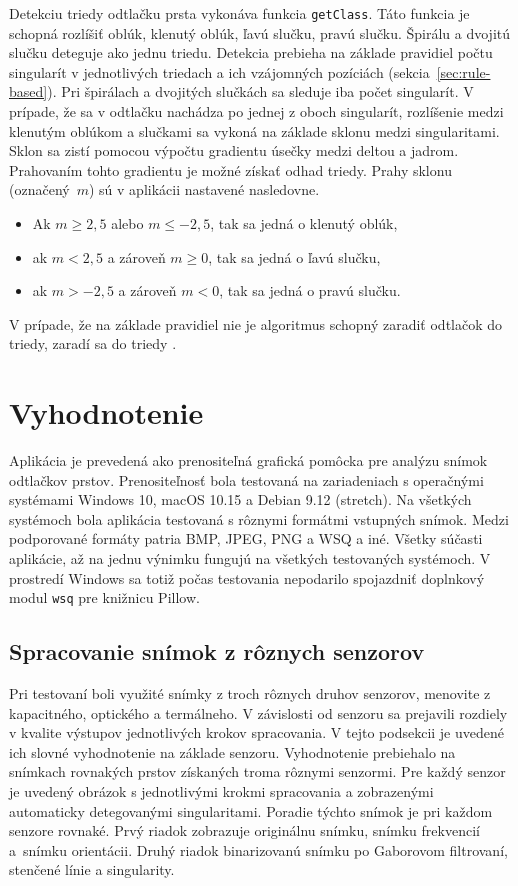   Detekciu triedy odtlačku prsta vykonáva funkcia \texttt{getClass}. Táto funkcia je schopná rozlíšiť oblúk, klenutý oblúk, ľavú slučku, pravú slučku.
  Špirálu a dvojitú slučku deteguje ako jednu triedu. Detekcia prebieha na základe pravidiel počtu singularít v jednotlivých triedach a ich vzájomných
  pozíciách (sekcia~{\ref{sec:rule-based}}). Pri špirálach a dvojitých slučkách sa sleduje iba počet singularít. V prípade, že sa
  v odtlačku nachádza po jednej z oboch singularít, rozlíšenie medzi klenutým oblúkom a slučkami sa vykoná na základe sklonu medzi singularitami. Sklon sa
  zistí pomocou výpočtu gradientu úsečky medzi deltou a jadrom. Prahovaním tohto gradientu je možné získať odhad triedy. Prahy sklonu (označený~{$m$})
  sú v aplikácii nastavené nasledovne.
  \begin{itemize}
    \item Ak $m \geq 2,5$ alebo $m \leq -2,5$, tak sa jedná o klenutý oblúk,
    \item ak $m < 2,5$ a zároveň $m \geq 0$, tak sa jedná o ľavú slučku,
    \item ak $m > -2,5$ a zároveň $m < 0$, tak sa jedná o pravú slučku.
  \end{itemize}
  V prípade, že na základe pravidiel nie je algoritmus schopný zaradiť odtlačok do triedy, zaradí sa do triedy .

\chapter{Vyhodnotenie} \label{kap:vyhodnotenie}
  Aplikácia je prevedená ako prenositeľná grafická pomôcka pre analýzu snímok odtlačkov prstov. Prenositeľnosť bola testovaná na zariadeniach s operačnými
  systémami Windows 10, macOS 10.15 a Debian 9.12 (stretch). Na všetkých systémoch bola aplikácia testovaná s rôznymi formátmi vstupných snímok. Medzi
  podporované formáty patria BMP, JPEG, PNG a WSQ a iné. Všetky súčasti aplikácie, až na jednu výnimku fungujú na všetkých testovaných systémoch. V prostredí
  Windows sa totiž počas testovania nepodarilo spojazdniť doplnkový modul \texttt{wsq} pre knižnicu Pillow.

  \section{Spracovanie snímok z rôznych senzorov}
  Pri testovaní boli využité snímky z troch rôznych druhov senzorov, menovite z kapacitného, optického a termálneho. V závislosti od senzoru sa prejavili
  rozdiely v kvalite výstupov jednotlivých krokov spracovania. V tejto podsekcii je uvedené ich slovné vyhodnotenie na základe senzoru.
  Vyhodnotenie prebiehalo na snímkach rovnakých prstov získaných troma rôznymi senzormi. Pre každý senzor je uvedený obrázok s jednotlivými krokmi spracovania
  a zobrazenými automaticky detegovanými singularitami. Poradie týchto snímok je pri každom senzore rovnaké. Prvý riadok zobrazuje originálnu snímku, snímku
  frekvencií a~snímku orientácii. Druhý riadok binarizovanú snímku po Gaborovom filtrovaní, stenčené línie a singularity.

